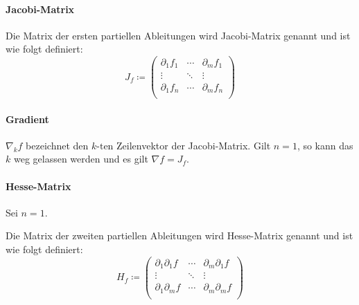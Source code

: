 \documentclass[a4paper, 11pt, accentcolor = tud3b]{tudreport}
\begin{document}
            \paragraph{Jacobi-Matrix}
                Die Matrix der ersten partiellen Ableitungen wird Jacobi-Matrix genannt und ist wie folgt definiert:
                \begin{equation*}
                    J _ f \coloneqq
                    \begin{pmatrix}
                        \partial _ 1 f _ 1 & \cdots & \partial _ m f _ 1 \\
                        \vdots & \ddots & \vdots \\
                        \partial _ 1 f _ n & \cdots & \partial _ m f _ n \\
                    \end{pmatrix}
                \end{equation*}

            \paragraph{Gradient}
                $ \nabla _ k f $ bezeichnet den $ k\text{-ten} $ Zeilenvektor der Jacobi-Matrix. Gilt $ n = 1 $, so kann das $ k $ weg gelassen werden und es gilt $ \nabla f = J _ f $.

            \paragraph{Hesse-Matrix}
                Sei $ n = 1 $.

                Die Matrix der zweiten partiellen Ableitungen wird Hesse-Matrix genannt und ist wie folgt definiert:
                \begin{equation*}
                    H _ f \coloneqq
                    \begin{pmatrix}
                        \partial _ 1 \partial _ 1 f & \cdots & \partial _ m \partial _ 1 f \\
                        \vdots & \ddots & \vdots \\
                        \partial _ 1 \partial _ m f & \cdots & \partial _ m \partial _ m f \\
                    \end{pmatrix}
                \end{equation*}
\end{document}
